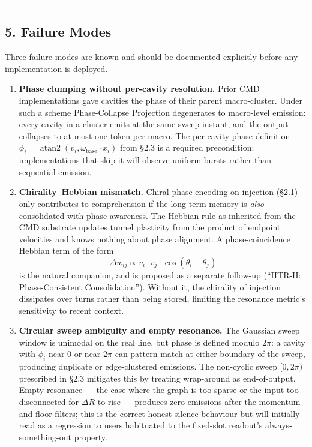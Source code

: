 \documentclass[
  11pt,
  a4paper,
]{article}
\begin{document}
\begin{center}\rule{0.5\linewidth}{0.5pt}\end{center}

\subsection{5. Failure Modes}\label{failure-modes}

Three failure modes are known and should be documented explicitly before
any implementation is deployed.

\begin{enumerate}
\def\labelenumi{\arabic{enumi}.}
\item
  \textbf{Phase clumping without per-cavity resolution.} Prior CMD
  implementations gave cavities the phase of their parent macro-cluster.
  Under such a scheme Phase-Collapse Projection degenerates to
  macro-level emission: every cavity in a cluster emits at the same
  sweep instant, and the output collapses to at most one token per
  macro. The per-cavity phase definition
  \(\phi_i = \operatorname{atan2}(v_i, \omega_{\text{base}} \cdot x_i)\)
  from §2.3 is a required precondition; implementations that skip it
  will observe uniform bursts rather than sequential emission.
\item
  \textbf{Chirality--Hebbian mismatch.} Chiral phase encoding on
  injection (§2.1) only contributes to comprehension if the long-term
  memory is \emph{also} consolidated with phase awareness. The Hebbian
  rule as inherited from the CMD substrate updates tunnel plasticity
  from the product of endpoint velocities and knows nothing about phase
  alignment. A phase-coincidence Hebbian term of the form
  \[ \Delta w_{ij} \propto v_i \cdot v_j \cdot \cos(\theta_i - \theta_j) \]
  is the natural companion, and is proposed as a separate follow-up
  (``HTR-II: Phase-Consistent Consolidation''). Without it, the
  chirality of injection dissipates over turns rather than being stored,
  limiting the resonance metric's sensitivity to recent context.
\item
  \textbf{Circular sweep ambiguity and empty resonance.} The Gaussian
  sweep window is unimodal on the real line, but phase is defined modulo
  \(2\pi\): a cavity with \(\phi_i\) near \(0\) or near \(2\pi\) can
  pattern-match at either boundary of the sweep, producing duplicate or
  edge-clustered emissions. The non-cyclic sweep \([0, 2\pi)\)
  prescribed in §2.3 mitigates this by treating wrap-around as
  end-of-output. Empty resonance --- the case where the graph is too
  sparse or the input too disconnected for \(\Delta R\) to rise ---
  produces zero emissions after the momentum and floor filters; this is
  the correct honest-silence behaviour but will initially read as a
  regression to users habituated to the fixed-slot readout's
  always-something-out property.
\end{enumerate}
\end{document}
